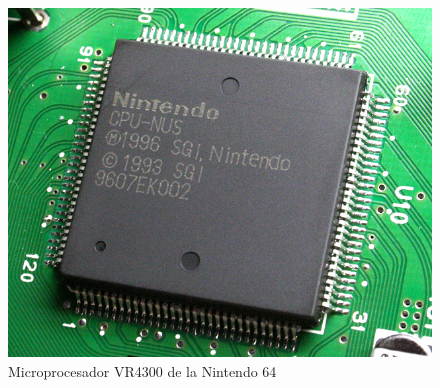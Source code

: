 \begin{figure}[htb]
	\centering
	\includegraphics[scale = 0.15]{Graphics/CPU-NUS_01-Nintendo64.jpg}
	\caption{Microprocesador VR4300 de la Nintendo 64}
	\label{fig:18}
\end{figure}

